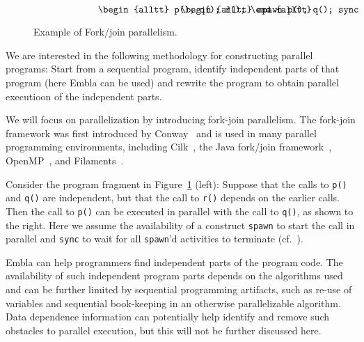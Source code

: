 \documentclass[times, 10pt,twocolumn]{article}
\begin{document}
\begin{figure}
\small
\hrulefill
\[
\begin{minipage}[t]{3cm}
\begin{alltt}
   p();
   q();
   r();
\end{alltt}
\end{minipage}
\begin{minipage}[t]{3cm}
\begin{alltt}
   spawn p();
   q();
   sync;
   r();
\end{alltt}
\end{minipage} 
\]
\hrulefill
\caption{Example of Fork/join parallelism.}
\label{fforkjoin}
\end{figure}

We are interested in the following methodology for constructing
parallel programs: Start from a sequential program, identify
independent parts of that program (here Embla can be used) and rewrite
the program to obtain parallel executioon of the independent parts.

We will focus on parallelization by introducing
fork-join parallelism. The fork-join framework was first introduced
by Conway~\cite{Conway63} and is used in many parallel
programming environments,
including Cilk~\cite{BJKLR96}, the Java fork/join
framework~\cite{Lea00}, OpenMP~\cite{DM98}, and Filaments~\cite{LF00}.

Consider the program fragment in
Figure~\ref{fforkjoin} (left):
Suppose that the calls to {\tt p()} and {\tt q()} are independent,
but that the call to {\tt r()} depends on the earlier calls. Then
the call to {\tt p()} can be
executed in parallel with
the call to {\tt q()}, as shown to the right.
Here we assume the availability of a construct {\tt spawn} to start
the call in parallel and {\tt sync} to wait for all {\tt spawn}'d
activities to terminate (cf.~\cite{BJKLR96}).

Embla can help programmers find independent parts of the 
program code. 
The availability of such independent program parts depends on
the algorithms used and can be further
limited by sequential programming artifacts, such as re-use of
variables and sequential book-keeping in an otherwise parallelizable
algorithm.  Data dependence information can potentially help
identify and remove such obstacles to parallel execution, but this
will not be further discussed here.
\end{document}

